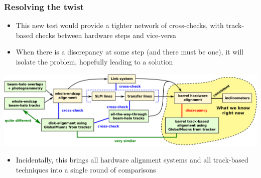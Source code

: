 \documentclass[compress]{beamer}
\begin{document}
\begin{frame}
\frametitle{Resolving the twist}
\begin{itemize}
\item This new test would provide a tighter network of cross-checks, with
  track-based checks between hardware steps and vice-versa

\item When there is a discrepancy at some step (and there must be one), it
  will isolate the problem, hopefully leading to a solution
\end{itemize}

\vfill
\includegraphics[width=\linewidth]{together.pdf}

\vfill
\begin{itemize}
\item Incidentally, this brings all hardware alignment systems and all
  track-based techniques into a single round of comparisons
\end{itemize}
\end{frame}

\end{document}
